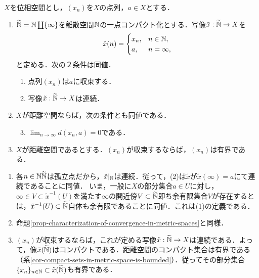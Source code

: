 \documentclass[uplatex,dvipdfmx]{jsreport}
\begin{document}
\begin{proposition}[収束の特徴付け]\label{prop-characterization-of-convergence-in-terms-of-continuousness}
    $X$を位相空間とし，$(x_n)$を$X$の点列，$a\in X$とする．
    \begin{enumerate}
        \item $\widetilde{\mathbb{N}}=\mathbb{N}\coprod\{\infty\}$を離散空間$\mathbb{N}$の一点コンパクト化とする．写像$\tilde{x}:\widetilde{\mathbb{N}}\to X$を\[\tilde{x}(n)=\begin{cases}
            x_n,&n\in\mathbb{N},\\a,&n=\infty,
        \end{cases}\]と定める．次の２条件は同値．
        \begin{enumerate}[(1)]
            \item 点列$(x_n)$は$a$に収束する．
            \item 写像$\tilde{x}:\widetilde{\mathbb{N}}\to X$は連続．
        \end{enumerate}
        \item $X$が距離空間ならば，次の条件とも同値である．
        \begin{enumerate}[(1)]\setcounter{enumii}{2}
            \item $\lim_{n\to\infty}d(x_n,a)=0$である．
        \end{enumerate}
        \item $X$が距離空間であるとする．$(x_n)$が収束するならば，$(x_n)$は有界である．
    \end{enumerate}
\end{proposition}
\begin{Proof}\mbox{}
    \begin{enumerate}
        \item 各$n\in\mathbb{N}\widetilde{\mathbb{N}}$は孤立点だから，$\tilde{x}|_{\mathbb{N}}$は連続．従って，(2)は$\tilde{x}$が$\tilde{x}(\infty)=a$にて連続であることに同値．
        いま，一般に$X$の部分集合$a\in U$に対し，$\infty\in V\subset\tilde{x}^{-1}(U)$を満たす$\infty$の開近傍$V\subset\widetilde{\mathbb{N}}$即ち余有限集合$V$が存在するとは，$\tilde{x}^{-1}(U)\subset\widetilde{\mathbb{N}}$自体も余有限であることに同値．これは(1)の定義である．
        \item 命題\ref{prop-characterization-of-convergence-in-metric-spaces}と同様．
        \item $(x_n)$が収束するならば，これが定める写像$\tilde{x}:\widetilde{\mathbb{N}}\to X$は連続である．よって，像$\tilde{x}(\widetilde{\mathbb{N}})$はコンパクトである．距離空間のコンパクト集合は有界である（系\ref{cor-compact-sets-in-metric-space-is-bounded}）．従ってその部分集合$\{x_n\}_{n\in\mathbb{N}}\subset\tilde{x}(\widetilde{\mathbb{N}})$も有界である．
    \end{enumerate}
\end{Proof}
\end{document}
